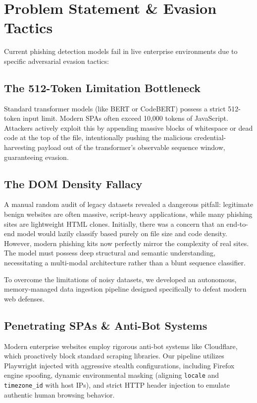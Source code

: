 \documentclass[conference]{IEEEtran}
\begin{document}
\section{Problem Statement \& Evasion Tactics}
Current phishing detection models fail in live enterprise environments due to specific adversarial evasion tactics:

\subsection{The 512-Token Limitation Bottleneck}
Standard transformer models (like BERT or CodeBERT) possess a strict 512-token input limit. Modern SPAs often exceed 10,000 tokens of JavaScript. Attackers actively exploit this by appending massive blocks of whitespace or dead code at the top of the file, intentionally pushing the malicious credential-harvesting payload out of the transformer's observable sequence window, guaranteeing evasion.

\subsection{The DOM Density Fallacy}
A manual random audit of legacy datasets revealed a dangerous pitfall: legitimate benign websites are often massive, script-heavy applications, while many phishing sites are lightweight HTML clones. Initially, there was a concern that an end-to-end model would lazily classify based purely on file size and code density. However, modern phishing kits now perfectly mirror the complexity of real sites. The model must possess deep structural and semantic understanding, necessitating a multi-modal architecture rather than a blunt sequence classifier.

To overcome the limitations of noisy datasets, we developed an autonomous, memory-managed data ingestion pipeline designed specifically to defeat modern web defenses.

\subsection{Penetrating SPAs \& Anti-Bot Systems}
Modern enterprise websites employ rigorous anti-bot systems like Cloudflare, which proactively block standard scraping libraries. Our pipeline utilizes Playwright injected with aggressive stealth configurations, including Firefox engine spoofing, dynamic environmental masking (aligning \texttt{locale} and \texttt{timezone\_id} with host IPs), and strict HTTP header injection to emulate authentic human browsing behavior.
\end{document}
